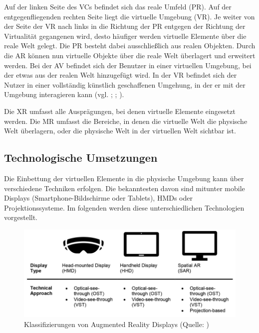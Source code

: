 Auf der linken Seite des \ac{VC}s befindet sich das reale Umfeld (\ac{PR}). Auf der entgegenfliegenden rechten Seite liegt die virtuelle Umgebung (\ac{VR}). Je weiter von der Seite der \ac{VR} nach links in die Richtung der \ac{PR} entgegen der Richtung der Virtualität gegangenen wird, desto häufiger werden virtuelle Elemente über die reale Welt gelegt. Die \ac{PR} besteht dabei ausschließlich aus realen Objekten. Durch die \ac{AR} können nun virtuelle Objekte über die reale Welt überlagert und erweitert werden. Bei der \ac{AV} befindet sich der Benutzer in einer virtuellen Umgebung, bei der etwas aus der realen Welt hinzugefügt wird. In der \ac{VR} befindet sich der Nutzer in einer vollständig künstlich geschaffenen Umgehung, in der er mit der Umgebung interagieren kann (vgl. \citealp[S. 3]{milgram_taxonomy_1994}; \citealp[S. 8f]{knoll_augmented_2022}; \citealp[S. 3]{zuniga_gonzalez_making_2021}). 

Die \ac{XR} umfasst alle Ausprägungen, bei denen virtuelle Elemente eingesetzt werden. Die \ac{MR} umfasst die Bereiche, in denen die virtuelle Welt die physische Welt überlagern, oder die physische Welt in der virtuellen Welt sichtbar ist. 

\subsection{Technologische Umsetzungen}
Die Einbettung der virtuellen Elemente in die physische Umgebung kann über verschiedene Techniken erfolgen. Die bekanntesten davon sind mitunter mobile Displays (Smartphone-Bildschirme oder Tablets), \ac{HMD}s oder Projektionssysteme. Im folgenden werden diese unterschiedlichen Technologien vorgestellt.
\begin{figure}[ht]
\centering
\includegraphics[width=1\linewidth]{content/pictures/devices.PNG}
\caption{Klassifizierungen von Augmented Reality Displays (Quelle: \citealp[S. 315]{leins_comparing_2024})}
\label{fig:ar-classes}
\end{figure}
